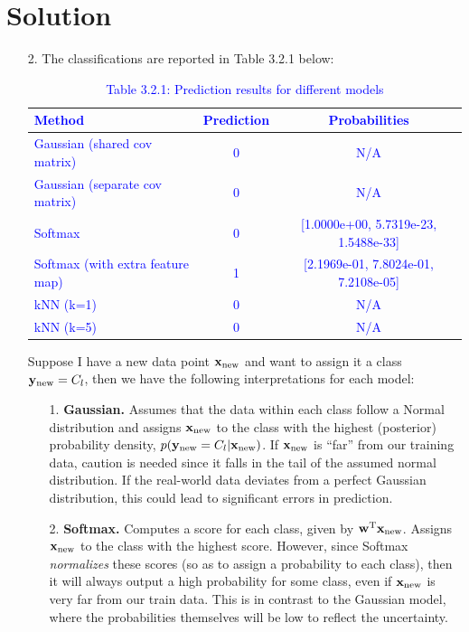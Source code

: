 \documentclass[submit]{../harvardml}
\newenvironment{solution}
  {\color{blue}\section*{Solution}}
{}
\begin{document}
\begin{solution}
\begin{enumerate}
    \item[2.] The classifications are reported in Table 3.2.1 below:
\begin{table}[H]
    \centering
    \renewcommand{\arraystretch}{1.3} %
    \begin{tabular}{|l|c|c|}
        \hline
        \textcolor{blue}{\textbf{Method}} & \textcolor{blue}{\textbf{Prediction}} & \textcolor{blue}{\textbf{Probabilities}} \\
        \hline
        \textcolor{blue}{Gaussian (shared cov matrix)} & \textcolor{blue}{0} & \textcolor{blue}{N/A} \\
        \hline
        \textcolor{blue}{Gaussian (separate cov matrix)} & \textcolor{blue}{0} & \textcolor{blue}{N/A} \\
        \hline
        \textcolor{blue}{Softmax} & \textcolor{blue}{0} & \textcolor{blue}{[1.0000e+00, 5.7319e-23, 1.5488e-33]} \\
        \hline
        \textcolor{blue}{Softmax (with extra feature map)} & \textcolor{blue}{1} & \textcolor{blue}{[2.1969e-01, 7.8024e-01, 7.2108e-05]} \\
        \hline
        \textcolor{blue}{kNN (k=1)} & \textcolor{blue}{0} & \textcolor{blue}{N/A} \\
        \hline
        \textcolor{blue}{kNN (k=5)} & \textcolor{blue}{0} & \textcolor{blue}{N/A} \\
        \hline
    \end{tabular}
    \caption*{\textcolor{blue}{Table 3.2.1: Prediction results for different models}}
\end{table}
    Suppose I have a new data point $\mathbf{x}_\text{new}$ and want to assign it a class $\mathbf{y}_\text{new} = C_l$, then we have the following interpretations for each model:
    \begin{enumerate}
        \item[1.] \textbf{Gaussian.} Assumes that the data within each class follow a Normal distribution and assigns $\mathbf{x}_\text{new}$ to the class with the highest (posterior) probability density, $p(\mathbf{y}_\text{new} = C_l | \mathbf{x}_\text{new})$. If $\mathbf{x}_\text{new}$ is ``far'' from our training data, caution is needed since it falls in the tail of the assumed normal distribution. If the real-world data deviates from a perfect Gaussian distribution, this could lead to significant errors in prediction.
        \item[2.] \textbf{Softmax.} Computes a score for each class, given by $\mathbf{w}^\mathrm{T}\mathbf{x}_\text{new}$. Assigns $\mathbf{x}_\text{new}$ to the class with the highest score. However, since Softmax \textit{normalizes} these scores (so as to assign a probability to each class), then it will always output a high probability for some class, even if $\mathbf{x}_\text{new}$ is very far from our train data. This is in contrast to the Gaussian model, where the probabilities themselves will be low to reflect the uncertainty.

\end{enumerate}
\end{enumerate}
\end{solution}
\end{document}
